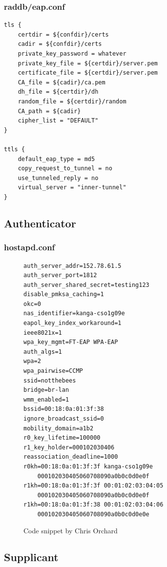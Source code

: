 \documentclass[12pt,a4paper,titlepage]{article}
\begin{document}
\subsubsection{raddb/eap.conf}
\begin{Verbatim}[frame=single]
tls {
    certdir = ${confdir}/certs
    cadir = ${confdir}/certs
    private_key_password = whatever
    private_key_file = ${certdir}/server.pem
    certificate_file = ${certdir}/server.pem
    CA_file = ${cadir}/ca.pem
    dh_file = ${certdir}/dh
    random_file = ${certdir}/random
    CA_path = ${cadir}
    cipher_list = "DEFAULT"
}

ttls {
    default_eap_type = md5
    copy_request_to_tunnel = no
    use_tunneled_reply = no
    virtual_server = "inner-tunnel"
}
\end{Verbatim}

\subsection{Authenticator}
\label{sec:Code;sub:authenticator}

\subsubsection{hostapd.conf}
\begin{figure}[h!]
\begin{Verbatim}[frame=single]
auth_server_addr=152.78.61.5
auth_server_port=1812
auth_server_shared_secret=testing123
disable_pmksa_caching=1
okc=0
nas_identifier=kanga-cso1g09e
eapol_key_index_workaround=1
ieee8021x=1
wpa_key_mgmt=FT-EAP WPA-EAP
auth_algs=1
wpa=2
wpa_pairwise=CCMP
ssid=notthebees
bridge=br-lan
wmm_enabled=1
bssid=00:18:0a:01:3f:38
ignore_broadcast_ssid=0
mobility_domain=a1b2
r0_key_lifetime=100000
r1_key_holder=000102030406
reassociation_deadline=1000
r0kh=00:18:0a:01:3f:3f kanga-cso1g09e
	000102030405060708090a0b0c0d0e0f
r1kh=00:18:0a:01:3f:3f 00:01:02:03:04:05
	000102030405060708090a0b0c0d0e0f
r1kh=00:18:0a:01:3f:38 00:01:02:03:04:06
	000102030405060708090a0b0c0d0e0e
\end{Verbatim}
\caption{Code snippet by Chris Orchard}
\end{figure}

\subsection{Supplicant}
\label{sec:Code;sub:supplicant}
\end{document}
